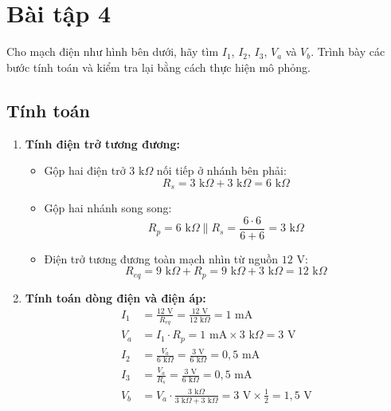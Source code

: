 \section{Bài tập 4}

Cho mạch điện như hình bên dưới, hãy tìm $I_1$, $I_2$, $I_3$, $V_a$ và $V_b$. Trình bày các bước tính toán và kiểm tra lại bằng cách thực hiện mô phỏng.


\subsection{Tính toán}
\begin{enumerate}[leftmargin=2em]
  \item \textbf{Tính điện trở tương đương:}
        \begin{itemize}
          \item Gộp hai điện trở $3\text{ k}\Omega$ nối tiếp ở nhánh bên phải:
                \[
                R_s = 3\text{ k}\Omega + 3\text{ k}\Omega = 6\text{ k}\Omega
                \]
          \item Gộp hai nhánh song song:
                \[
                R_p = 6\text{ k}\Omega \parallel R_s = \frac{6 \cdot 6}{6 + 6} = 3\text{ k}\Omega
                \]
          \item Điện trở tương đương toàn mạch nhìn từ nguồn $12\text{ V}$:
                \[
                R_{eq} = 9\text{ k}\Omega + R_p = 9\text{ k}\Omega + 3\text{ k}\Omega = 12\text{ k}\Omega
                \]
        \end{itemize}
  \item \textbf{Tính toán dòng điện và điện áp:}
        \begin{align*}
        I_1 &= \frac{12\text{ V}}{R_{eq}} = \frac{12\text{ V}}{12\text{ k}\Omega} = 1\text{ mA} \\
        V_a &= I_1 \cdot R_p = 1\text{ mA} \times 3\text{ k}\Omega = 3\text{ V} \\
        I_2 &= \frac{V_a}{6\text{ k}\Omega} = \frac{3\text{ V}}{6\text{ k}\Omega} = 0{,}5\text{ mA} \\
        I_3 &= \frac{V_a}{R_s} = \frac{3\text{ V}}{6\text{ k}\Omega} = 0{,}5\text{ mA} \\
        V_b &= V_a \cdot \frac{3\text{ k}\Omega}{3\text{ k}\Omega + 3\text{ k}\Omega} = 3\text{ V} \times \frac{1}{2} = 1{,}5\text{ V}
        \end{align*}
\end{enumerate}

